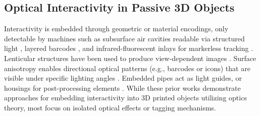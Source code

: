 \subsection{Optical Interactivity in Passive 3D Objects}
Interactivity is embedded through geometric or material encodings, only detectable by machines such as subsurface air cavities readable via structured light \cite{li2017aircode}, layered barcodes %
\cite{maia2019layercode}, and infrared-fluorescent inlays for markerless tracking \cite{dogan2023brightmarker}. %
Lenticular structures have been used to produce view-dependent images %
\cite{zeng2021lenticular}.
Surface anisotropy enables directional optical patterns (e.g., barcodes or icons) that are visible under specific lighting angles \cite{ma2023anisotag, Lu2025LumosX}.
Embedded pipes act as light guides, or housings for post-processing elements \cite{series_of_tubes_2014}. %
While these prior works demonstrate approaches for embedding interactivity into 3D printed objects utilizing optics theory, most focus on isolated optical effects or tagging mechanisms. 

